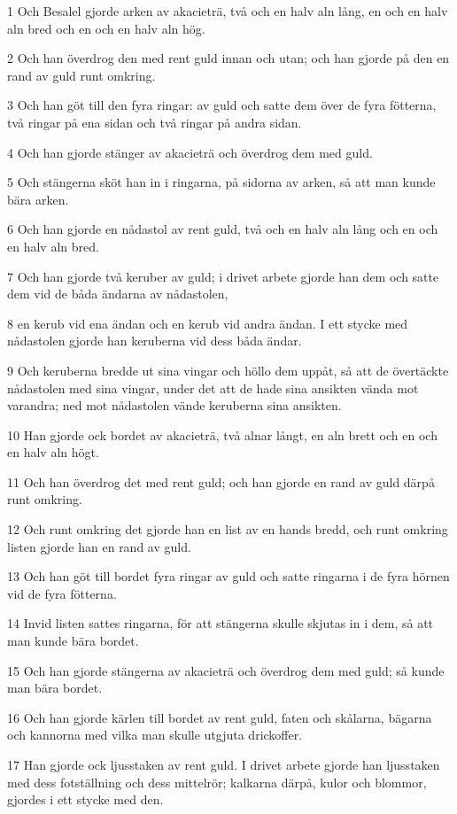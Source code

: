 \par 1 Och Besalel gjorde arken av akacieträ, två och en halv aln lång, en och en halv aln bred och en och en halv aln hög.
\par 2 Och han överdrog den med rent guld innan och utan; och han gjorde på den en rand av guld runt omkring.
\par 3 Och han göt till den fyra ringar: av guld och satte dem över de fyra fötterna, två ringar på ena sidan och två ringar på andra sidan.
\par 4 Och han gjorde stänger av akacieträ och överdrog dem med guld.
\par 5 Och stängerna sköt han in i ringarna, på sidorna av arken, så att man kunde bära arken.
\par 6 Och han gjorde en nådastol av rent guld, två och en halv aln lång och en och en halv aln bred.
\par 7 Och han gjorde två keruber av guld; i drivet arbete gjorde han dem och satte dem vid de båda ändarna av nådastolen,
\par 8 en kerub vid ena ändan och en kerub vid andra ändan. I ett stycke med nådastolen gjorde han keruberna vid dess båda ändar.
\par 9 Och keruberna bredde ut sina vingar och höllo dem uppåt, så att de övertäckte nådastolen med sina vingar, under det att de hade sina ansikten vända mot varandra; ned mot nådastolen vände keruberna sina ansikten.
\par 10 Han gjorde ock bordet av akacieträ, två alnar långt, en aln brett och en och en halv aln högt.
\par 11 Och han överdrog det med rent guld; och han gjorde en rand av guld därpå runt omkring.
\par 12 Och runt omkring det gjorde han en list av en hands bredd, och runt omkring listen gjorde han en rand av guld.
\par 13 Och han göt till bordet fyra ringar av guld och satte ringarna i de fyra hörnen vid de fyra fötterna.
\par 14 Invid listen sattes ringarna, för att stängerna skulle skjutas in i dem, så att man kunde bära bordet.
\par 15 Och han gjorde stängerna av akacieträ och överdrog dem med guld; så kunde man bära bordet.
\par 16 Och han gjorde kärlen till bordet av rent guld, faten och skålarna, bägarna och kannorna med vilka man skulle utgjuta drickoffer.
\par 17 Han gjorde ock ljusstaken av rent guld. I drivet arbete gjorde han ljusstaken med dess fotställning och dess mittelrör; kalkarna därpå, kulor och blommor, gjordes i ett stycke med den.
